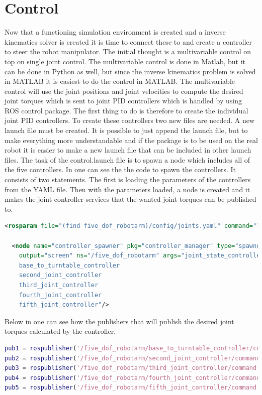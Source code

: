 \chapter{Control}

Now that a functioning simulation environment is created and a inverse kinematics solver is created it is time to connect these to and create a controller to steer the robot manipulator. The initial thought is a multivariable control on top on single joint control. The multivariable control is done in Matlab, but it can be done in Python as well, but since the inverse kinematics problem is solved in MATLAB it is easiest to do the control in MATLAB. The multivariable control will use the joint positions and joint velocities to compute the desired joint torques which is sent to joint PID controllers which is handled by using ROS control package. The first thing to do is therefore to create the individual joint PID controllers. 
To create these controllers two new files are needed. A new launch file must be created. It is possible to just append the launch file, but to make everything more understandable and if the package is to be used on the real robot it is easier to make a new launch file that can be included in other launch files. The task of the control.launch file is to spawn a node which includes all of the five controllers. In  one can see the the code to spawn the controllers. It consists of two statements. The first is loading the parameters of the controllers from the YAML file. Then with the parameters loaded, a node is created and it makes the joint controller services that the wanted joint torques can be published to. 
\begin{lstlisting}[language=xml,caption={Spawns the controller node},label={lst:launchControl}]
<rosparam file="(find five_dof_robotarm)/config/joints.yaml" command="load"/>

  <node name="controller_spawner" pkg="controller_manager" type="spawner" respawn="false"
	output="screen" ns="/five_dof_robotarm" args="joint_state_controller
    base_to_turntable_controller
    second_joint_controller
    third_joint_controller
    fourth_joint_controller
    fifth_joint_controller"/>
\end{lstlisting}
Below in  one can see how the publishers that will publish the desired joint torques calculated by the controller. 
\begin{lstlisting}[language=Matlab,caption={MATLAB code for creating the publishers.},label={lst:matlabPubl}]
pub1 = rospublisher('/five_dof_robotarm/base_to_turntable_controller/command','std_msgs/Float64');
pub2 = rospublisher('/five_dof_robotarm/second_joint_controller/command','std_msgs/Float64');
pub3 = rospublisher('/five_dof_robotarm/third_joint_controller/command','std_msgs/Float64');
pub4 = rospublisher('/five_dof_robotarm/fourth_joint_controller/command','std_msgs/Float64');
pub5 = rospublisher('/five_dof_robotarm/fifth_joint_controller/command','std_msgs/Float64');
\end{lstlisting}
